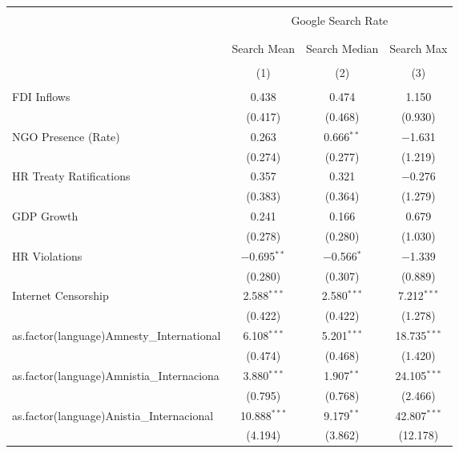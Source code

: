 
\begin{table}[!htbp] \centering 
  \caption{} 
  \label{} 
\begin{tabular}{@{\extracolsep{5pt}}lccc} 
\\[-1.8ex]\hline 
\hline \\[-1.8ex] 
 & \multicolumn{3}{c}{Google Search Rate} \\ 
\cline{2-4} 
\\[-1.8ex] & \multicolumn{3}{c}{ } \\ 
 & Search Mean & Search Median & Search Max \\ 
\\[-1.8ex] & (1) & (2) & (3)\\ 
\hline \\[-1.8ex] 
 FDI Inflows & 0.438 & 0.474 & 1.150 \\ 
  & (0.417) & (0.468) & (0.930) \\ 
  NGO Presence (Rate) & 0.263 & 0.666$^{**}$ & $-$1.631 \\ 
  & (0.274) & (0.277) & (1.219) \\ 
  HR Treaty Ratifications & 0.357 & 0.321 & $-$0.276 \\ 
  & (0.383) & (0.364) & (1.279) \\ 
  GDP Growth & 0.241 & 0.166 & 0.679 \\ 
  & (0.278) & (0.280) & (1.030) \\ 
  HR Violations & $-$0.695$^{**}$ & $-$0.566$^{*}$ & $-$1.339 \\ 
  & (0.280) & (0.307) & (0.889) \\ 
  Internet Censorship & 2.588$^{***}$ & 2.580$^{***}$ & 7.212$^{***}$ \\ 
  & (0.422) & (0.422) & (1.278) \\ 
  as.factor(language)Amnesty\_International & 6.108$^{***}$ & 5.201$^{***}$ & 18.735$^{***}$ \\ 
  & (0.474) & (0.468) & (1.420) \\ 
  as.factor(language)Amnistia\_Internaciona & 3.880$^{***}$ & 1.907$^{**}$ & 24.105$^{***}$ \\ 
  & (0.795) & (0.768) & (2.466) \\ 
  as.factor(language)Anistia\_Internacional & 10.888$^{***}$ & 9.179$^{**}$ & 42.807$^{***}$ \\ 
  & (4.194) & (3.862) & (12.178) \\ 

\end{tabular}
\end{table}
